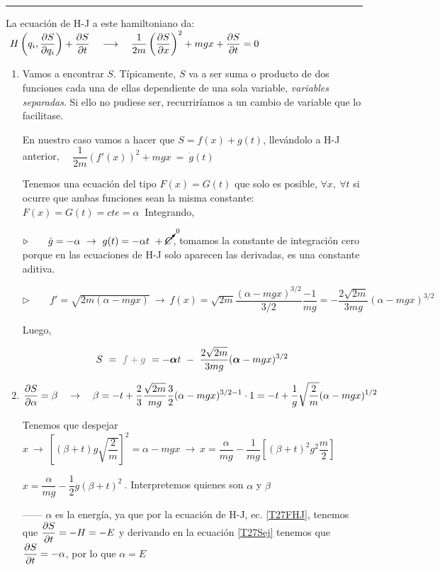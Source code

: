 \rule{250pt}{0.1pt}

La ecuación de H-J a este hamiltoniano da:
$\ \displaystyle H\left(q_i,\pdv{S}{q_i} \right) + \pdv{S}{t} \quad \longrightarrow \quad \dfrac 1{2m} \left( \pdv{S}{x} \right)^2 + mgx + \pdv{S}{t} = 0$


\begin{enumerate}
\item Vamos a encontrar $S$. Típicamente, $S$ va a ser suma o producto de dos funciones cada una de ellas dependiente de una sola variable, \emph{variables separadas}. Si ello no pudiese ser, recurriríamos a un cambio de variable que lo facilitase.

 En nuestro caso vamos a hacer que $S=f(x)+g(t)$, llevándolo a H-J anterior,
  $\quad \displaystyle \dfrac 1{2m} \left( f'(x) \right)^2 + mgx \ = \ \dot g(t)$
 
 Tenemos una ecuación del tipo  $F(x)=G(t)$ que solo es posible, $\forall x,\ \forall t$ si ocurre que ambas funciones sean la misma constante: $F(x)=G(t)=cte=\alpha\ $ Integrando,
 
 $\triangleright \qquad \dot g = -\alpha \ \to \ g(t)=-\alpha t \ + \cancelto{0}{C}$, tomamos la constante de integración cero porque en las ecuaciones de H-J solo aparecen las derivadas, es una constante aditiva.
 
 $\triangleright \qquad f'=\sqrt{2m(\alpha-mgx)}\ \to \  f(x)=\sqrt{2m}\dfrac{(\alpha -mgx)^{3/2}}{3/2}\dfrac{-1}{mg}=-\dfrac{2\sqrt{2m}}{3mg}(\alpha -mgx)^{3/2}$
 
 Luego, 
 
 \begin{equation}
 \label{T27Sej}
 S\ = \ \textcolor{gris}{f+g} \ = -\boldsymbol \alpha t \ - \ 	\dfrac{2\sqrt{2m}}{3mg}(\boldsymbol \alpha -mgx)^{3/2}
 \end{equation}

\item	$\displaystyle \pdv{S}{\alpha}=\beta \quad \to \quad \beta=-t+\dfrac 2 3 \dfrac{\sqrt{2m}}{mg} \dfrac 3 2 (\alpha-mgx)^{3/2-1}\cdot 1 = -t+\dfrac 1 g \sqrt{\dfrac 2 m} (\alpha-mgx)^{1/2}$

Tenemos que despejar $x \ \to \ \left[ (\beta + t) g \sqrt{\dfrac 2 m} \right]^2=\alpha-mgx \ \to \ x=\dfrac{\alpha}{mg}-\dfrac 1{mg}\left[ (\beta+t)^2 g^2 \dfrac m 2 \right]$

$x=\dfrac{\alpha}{mg}-\dfrac 1 2 g (\beta+t)^2\ $. Interpretemos quienes son $\alpha$ y $\beta$

\vspace{5mm}
------ $\alpha$ es la energía, ya que por la ecuación de H-J, ec. \ref{T27FHJ}, tenemos que $\displaystyle \pdv{S}{t}=-H=-E$ y derivando en la ecuación \ref{T27Sej} tenemos que $\displaystyle \pdv{S}{t}=-\alpha$, por lo que $\alpha=E$


\end{enumerate}
